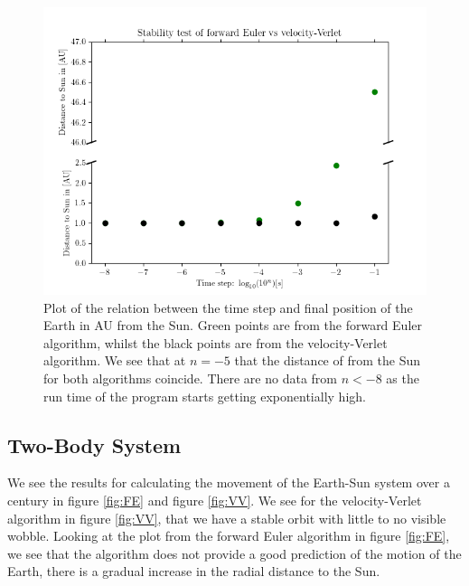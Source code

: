 \documentclass[%
reprint,
nofootinbib,
amsmath,amssymb,
aps,
]{revtex4-1}
\begin{document}
\begin{figure}[]
	\centering
	\includegraphics[width=0.9\linewidth]{../code/classes/figure/Stability.png}
	\caption{Plot of the relation between the time step and final position of the Earth in AU from the Sun. Green points are from the forward Euler algorithm, whilst the black points are from the velocity-Verlet algorithm. We see that at $n = -5$ that the distance of from the Sun for both algorithms coincide. There are no data from $n<-8$ as the run time of the program starts getting exponentially high.} 
	\label{fig:Stability}
\end{figure}
\subsection{Two-Body System}%
We see the results for calculating the movement of the Earth-Sun system over a century in figure \ref{fig:FE} and figure \ref{fig:VV}. We see for the velocity-Verlet algorithm in figure \ref{fig:VV}, that we have a stable orbit with little to no visible wobble. Looking at the plot from the forward Euler algorithm in figure \ref{fig:FE}, we see that the algorithm does not provide a good prediction of the motion of the Earth, there is a gradual increase in the radial distance to the Sun.
\end{document}
